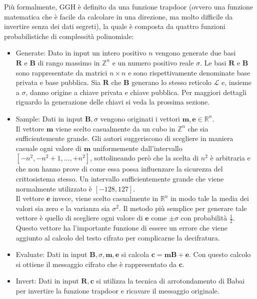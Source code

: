 Più formalmente, GGH è definito da una funzione trapdoor (ovvero una funzione matematica che è facile da 
calcolare in una direzione, ma molto difficile da invertire senza dei dati segreti), la quale
è composta da quattro funzioni probabilistiche di complessità polinomiale:
\begin{itemize}
    \item Generate: Dato in input un intero positivo $n$ vengono generate due basi 
    $\mathbf{R} \text{ e } \mathbf{B}$ di rango massimo in
    $\mathbb{Z}^n$ e un numero positivo reale $\sigma$. Le basi $\mathbf{R} \text{ e } \mathbf{B}$
    sono rappresentate da matrici $n \times n$ e sono rispettivamente denominate base 
    privata e base pubblica. Sia $\mathbf{R}$ che $\mathbf{B}$ generano lo stesso reticolo 
    $\mathcal{L}$ e, insieme a $\sigma$, danno origine a chiave privata e chiave pubblica.
    Per maggiori dettagli riguardo la generazione delle chiavi si veda la prossima sezione.
    \item Sample: Dati in input $\mathbf{B}, \sigma$ vengono originati i vettori
    $\mathbf{m},\mathbf{e} \in \mathbb{R}^n$. \\
    Il vettore $\mathbf{m}$ viene scelto casualmente da un cubo in $\mathbb{Z}^n$ che sia 
    sufficientemente grande. Gli autori suggeriscono di scegliere in maniera casuale
    ogni valore di $\mathbf{m}$ uniformemente dall'intervallo $[-n^2, -n^2 + 1, \dots, +n^2]$, 
    sottolineando però che la scelta di $n^2$ è arbitraria e che non hanno prove
    di come essa possa influenzare la sicurezza del crittosistema stesso. Un intervallo
    sufficientemente grande che viene normalmente utilizzato è $[-128, 127]$. \\
    Il vettore $\mathbf{e}$ invece, viene scelto casualmente in  $\mathbb{R}^n$ in modo
    tale la media dei valori sia zero e la varianza sia $\sigma^2$. Il metodo più semplice
    per generare tale vettore è quello di scegliere ogni valore di $\mathbf{e}$ come $\pm\sigma$
    con probabilità $\frac{1}{2}$. Questo vettore ha l'importante funzione di essere un errore
    che viene aggiunto al calcolo del testo cifrato per complicarne la decifratura. 
    \item Evaluate: Dati in input $\mathbf{B}, \sigma, \mathbf{m}, \mathbf{e}$ si calcola
    $\mathbf{c} = \mathbf{m}\mathbf{B} + \mathbf{e}$. Con questo calcolo si ottiene
    il messaggio cifrato che è rappresentato da $\mathbf{c}$. 
    \item Invert: Dati in input $\mathbf{R},\mathbf{c}$ si utilizza la tecnica di arrotondamento
    di Babai per invertire la funzione trapdoor e ricavare il messaggio originale.
\end{itemize}

%
%

%
%
